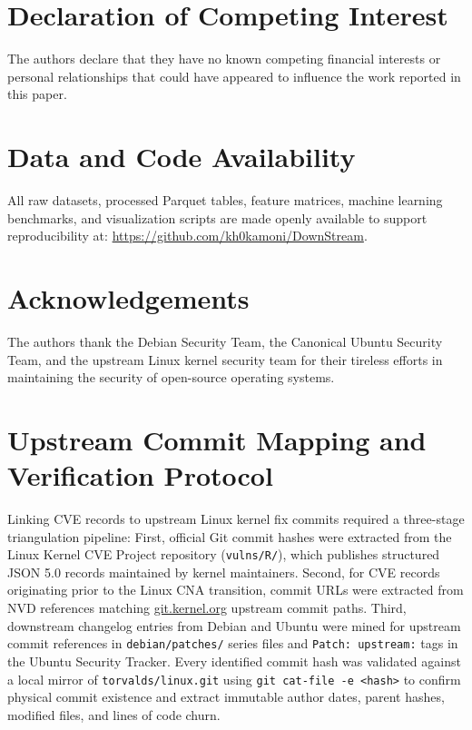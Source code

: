 \documentclass[final,5p,times,twocolumn]{elsarticle}
\begin{document}
\section*{Declaration of Competing Interest}
The authors declare that they have no known competing financial interests or personal relationships that could have appeared to influence the work reported in this paper.

\section*{Data and Code Availability}
All raw datasets, processed Parquet tables, feature matrices, machine learning benchmarks, and visualization scripts are made openly available to support reproducibility at: \url{https://github.com/kh0kamoni/DownStream}.

\section*{Acknowledgements}
The authors thank the Debian Security Team, the Canonical Ubuntu Security Team, and the upstream Linux kernel security team for their tireless efforts in maintaining the security of open-source operating systems.

\appendix

\section{Upstream Commit Mapping and Verification Protocol}
\label{app:commit_mapping}
Linking CVE records to upstream Linux kernel fix commits required a three-stage triangulation pipeline:
First, official Git commit hashes were extracted from the Linux Kernel CVE Project repository (\texttt{vulns/R/}), which publishes structured JSON 5.0 records maintained by kernel maintainers.
Second, for CVE records originating prior to the Linux CNA transition, commit URLs were extracted from NVD references matching \url{git.kernel.org} upstream commit paths.
Third, downstream changelog entries from Debian and Ubuntu were mined for upstream commit references in \texttt{debian/patches/} series files and \texttt{Patch: upstream:} tags in the Ubuntu Security Tracker. Every identified commit hash was validated against a local mirror of \texttt{torvalds/linux.git} using \texttt{git cat-file -e <hash>} to confirm physical commit existence and extract immutable author dates, parent hashes, modified files, and lines of code churn.
\end{document}
